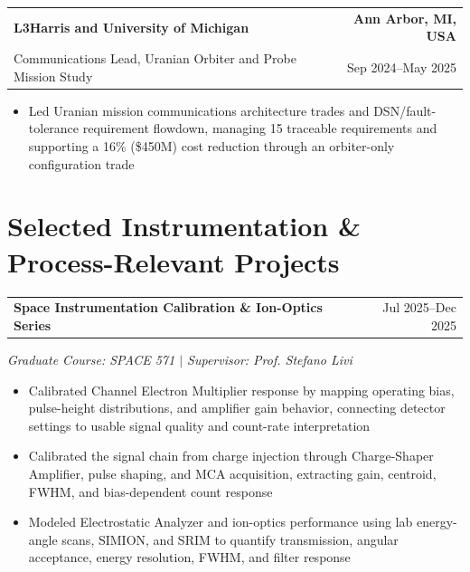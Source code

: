 \documentclass[10pt,a4paper]{article}
\makeatletter
\newcommand{\resumeSubheading}[4]{%
  \begin{tabular*}{\textwidth}{@{\extracolsep{\fill}}l r}
    \textbf{#1} & \textcolor{nameblue}{\textbf{#2}} \\
    #3 & #4
  \end{tabular*}\vspace{-1.6pt}
}
\newcommand{\resumeProjectHeading}[2]{%
  \begin{tabular*}{\textwidth}{@{\extracolsep{\fill}}l r}
    \textbf{#1} & #2
  \end{tabular*}\vspace{-1.6pt}
}
\newcommand{\resumeItemsStart}{\begin{itemize}}
\newcommand{\resumeItemsEnd}{\end{itemize}\vspace{-1.1pt}}
\newcommand{\resumeItem}[1]{\item #1}
\makeatother
\begin{document}

\resumeSubheading
  {L3Harris and University of Michigan}{Ann Arbor, MI, USA}
  {Communications Lead, Uranian Orbiter and Probe Mission Study}{Sep 2024--May 2025}
\resumeItemsStart
  \resumeItem{Led Uranian mission communications architecture trades and DSN/fault-tolerance requirement flowdown, managing 15 traceable requirements and supporting a 16\% (\$450M) cost reduction through an orbiter-only configuration trade}
\resumeItemsEnd

\section{Selected Instrumentation \& Process-Relevant Projects}
\resumeProjectHeading{Space Instrumentation Calibration \& Ion-Optics Series}{Jul 2025--Dec 2025}
{\itshape Graduate Course: SPACE 571 $\mid$ Supervisor: Prof. Stefano Livi}\vspace{-1.3pt}
\resumeItemsStart
  \resumeItem{Calibrated Channel Electron Multiplier response by mapping operating bias, pulse-height distributions, and amplifier gain behavior, connecting detector settings to usable signal quality and count-rate interpretation}
  \resumeItem{Calibrated the signal chain from charge injection through Charge-Shaper Amplifier, pulse shaping, and MCA acquisition, extracting gain, centroid, FWHM, and bias-dependent count response}
  \resumeItem{Modeled Electrostatic Analyzer and ion-optics performance using lab energy-angle scans, SIMION, and SRIM to quantify transmission, angular acceptance, energy resolution, FWHM, and filter response}
\resumeItemsEnd

\end{document}

